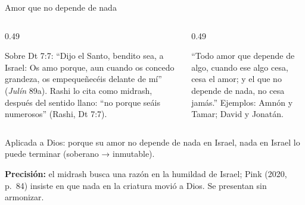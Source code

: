 \documentclass[hyperref={bookmarks=false},aspectratio=169]{beamer}
\newcommand{\precision}[1]{{\footnotesize\color{gris}\textbf{Precisión:} #1}}
\begin{document}
\begin{frame}{Amor que no depende de nada}
\begin{columns}[t,onlytextwidth]
\begin{column}{0.49\textwidth}
\begin{tcolorbox}[colback=papiro,colframe=azul,boxrule=0.8pt,arc=3pt,title={``Porque os empequeñecéis''},coltitle=papiro,colbacktitle=azul,fonttitle=\scriptsize\bfseries]
\scriptsize Sobre Dt 7:7: ``Dijo el Santo, bendito sea, a Israel: Os amo porque, aun cuando os concedo grandeza, os empequeñecéis delante de mí'' (\emph{Julín} 89a). Rashi lo cita como midrash, después del sentido llano: ``no porque seáis numerosos'' (Rashi, Dt 7:7).
\end{tcolorbox}
\end{column}
\begin{column}{0.49\textwidth}
\begin{tcolorbox}[colback=papiro,colframe=azul,boxrule=0.8pt,arc=3pt,title={\emph{Pirké Avot} 5:16},coltitle=papiro,colbacktitle=azul,fonttitle=\scriptsize\bfseries]
\scriptsize ``Todo amor que depende de algo, cuando ese algo cesa, cesa el amor; y el que no depende de nada, no cesa jamás.'' Ejemplos: Amnón y Tamar; David y Jonatán.
\end{tcolorbox}
\end{column}
\end{columns}\medskip
\small Aplicada a Dios: porque su amor no depende de nada en Israel, nada en Israel lo puede terminar (soberano → inmutable).\par\smallskip
\precision{el midrash busca una razón en la humildad de Israel; Pink (2020, p.~84) insiste en que nada en la criatura movió a Dios. Se presentan sin armonizar.}
\end{frame}
\end{document}
